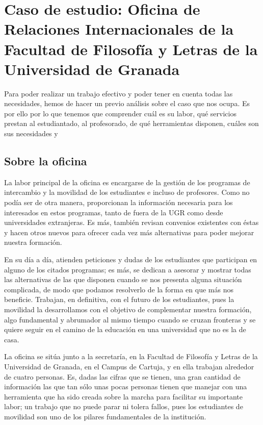 \section{Caso de estudio: Oficina de Relaciones Internacionales de la Facultad de Filosofía y Letras de la Universidad de Granada}

Para poder realizar un trabajo efectivo y poder tener en cuenta todas las necesidades, hemos de hacer un previo análisis sobre el caso que nos ocupa. Es por ello por lo que tenemos que comprender cuál es su labor, qué servicios prestan al estudiantado, al profesorado, de qué herramientas disponen, cuáles son sus necesidades y 

\subsection{Sobre la oficina}
La labor principal de la oficina es encargarse de la gestión de los programas de intercambio y la movilidad de los estudiantes e incluso de profesores. Como no podía ser de otra manera, proporcionan la información necesaria para los interesados en estos programas, tanto de fuera de la UGR como desde universidades extranjeras. Es más, también revisan convenios existentes con éstas y hacen otros nuevos para ofrecer cada vez más alternativas para poder mejorar nuestra formación.

En su día a día, atienden peticiones y dudas de los estudiantes que participan en alguno de los citados programas; es más, se dedican a asesorar y mostrar todas las alternativas de las que disponen cuando se nos presenta alguna situación complicada, de modo que podamos resolverlo de la forma en que más nos beneficie. Trabajan, en definitiva, con el futuro de los estudiantes, pues la movilidad la desarrollamos con el objetivo de complementar nuestra formación, algo fundamental y abrumador al mismo tiempo cuando se cruzan fronteras y se quiere seguir en el camino de la educación en una universidad que no es la de casa.

La oficina se sitúa junto a la secretaría, en la Facultad de Filosofía y Letras de la Universidad de Granada, en el Campus de Cartuja, y en ella trabajan alrededor de cuatro personas. Es, dadas las cifras que se tienen, una gran cantidad de información las que tan sólo unas pocas personas tienen que manejar con una herramienta que ha sido creada sobre la marcha para facilitar su importante labor; un trabajo que no puede parar ni tolera fallos, pues los estudiantes de movilidad son uno de los pilares fundamentales de la institución.

